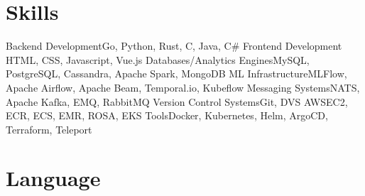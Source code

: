\section{Skills}

\cvcomputer%
{Backend Development}{Go, Python, Rust, C, Java, C\#}
{Frontend Development}
{HTML, CSS, Javascript, Vue.js}
\vspace{0.5cm}
\cvcomputer%
{Databases/Analytics Engines}{MySQL, PostgreSQL, Cassandra, Apache Spark, MongoDB}
{ML Infrastructure}{MLFlow, Apache Airflow, Apache Beam, Temporal.io, Kubeflow}
\vspace{0.5cm}
\cvcomputer%
{Messaging Systems}{NATS, Apache Kafka, EMQ, RabbitMQ}
{Version Control Systems}{Git, DVS}
\vspace{0.5cm}
\cvcomputer%
{AWS}{EC2, ECR, ECS, EMR, ROSA, EKS}
{Tools}{Docker, Kubernetes, Helm, ArgoCD, Terraform, Teleport}

\section{Language}


\emptysection{}\closesection{}

